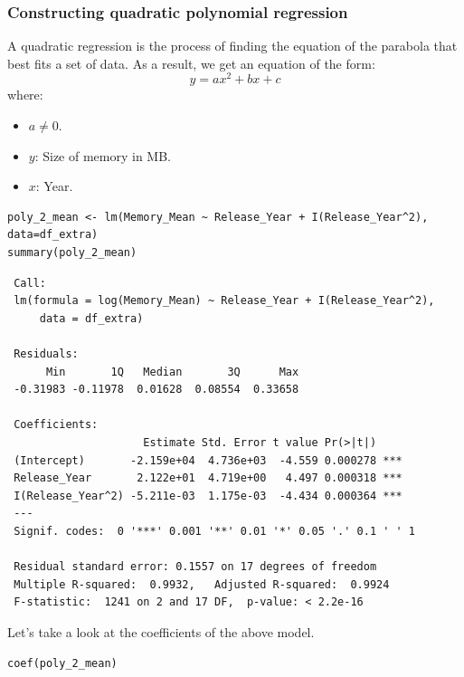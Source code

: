 \documentclass[a4paper]{article}
\begin{document}
\subsubsection{Constructing quadratic polynomial regression}
A quadratic regression is the process of finding the equation of the parabola that best fits a set of data. As a result, we get an equation of the form:
\begin{equation*}
    y=ax^2+bx+c
\end{equation*}
where:
\begin{itemize}
    \item $a \neq 0$.
    \item $y$: Size of memory in MB.
    \item $x$: Year.
\end{itemize}
\begin{mdframed}[leftline=false,rightline=false,backgroundcolor=lightblue!10,nobreak=false]
    \begin{verbatim}
poly_2_mean <- lm(Memory_Mean ~ Release_Year + I(Release_Year^2), data=df_extra)
summary(poly_2_mean)
    \end{verbatim}
\end{mdframed}
\begin{lstlisting}
 Call:
 lm(formula = log(Memory_Mean) ~ Release_Year + I(Release_Year^2), 
     data = df_extra)

 Residuals:
      Min       1Q   Median       3Q      Max 
 -0.31983 -0.11978  0.01628  0.08554  0.33658 

 Coefficients:
                     Estimate Std. Error t value Pr(>|t|)    
 (Intercept)       -2.159e+04  4.736e+03  -4.559 0.000278 ***
 Release_Year       2.122e+01  4.719e+00   4.497 0.000318 ***
 I(Release_Year^2) -5.211e-03  1.175e-03  -4.434 0.000364 ***
 ---
 Signif. codes:  0 '***' 0.001 '**' 0.01 '*' 0.05 '.' 0.1 ' ' 1

 Residual standard error: 0.1557 on 17 degrees of freedom
 Multiple R-squared:  0.9932,	Adjusted R-squared:  0.9924 
 F-statistic:  1241 on 2 and 17 DF,  p-value: < 2.2e-16
\end{lstlisting}
Let's take a look at the coefficients of the above model.
\begin{mdframed}[leftline=false,rightline=false,backgroundcolor=lightblue!10,nobreak=false]
    \begin{verbatim}
coef(poly_2_mean)
    \end{verbatim}
\end{mdframed}
\end{document}

